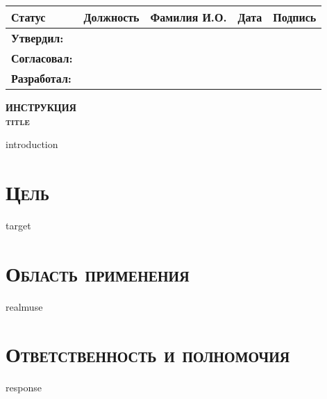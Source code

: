 {{{{{{{{\vspace{2mm}
\begin{tabu} to \textwidth { |X|X|X|X|X|   }
\hline
\textbf{Статус} & \textbf{Должность} & \textbf{Фамилия И.О.}& \textbf{Дата} & \textbf{Подпись} \\  [1ex] \hline
\textbf{Утвердил:}    & \approverPost{}  & \varApprover{}   & \varDateapprove{}   &  \\  [2ex] \hline
\textbf{Согласовал:}   & \visantPost{}    & \varVisant{}    & \varDatevise{}      &  \\  [2ex] \hline
\textbf{Разработал:}   & \initiatorPost{} & \varInitiator{} & \varDatecreation{}  &  \\  [2ex] \hline
\end{tabu}

\pagebreak

\pagestyle{firstpage}

\vspace{1cm}

\tableofcontents

\vfill

\pagebreak

\pagestyle{maintext}

\begin{center}
\Large \textbf{\textsc{ИНСТРУКЦИЯ}} \\
\vspace{1mm}
\Large \textbf{\textsc{ {{title}} }} \\
\end{center}

\begin{flushleft}

{{introduction}}

\section{\large \textbf{\textsc{Цель}}}
{{target}}

\section{\large \textbf{\textsc{Область применения}}}
{{realmuse}}

\section{\large \textbf{\textsc{Ответственность и полномочия}}}
{{response}}


\end{flushleft}}}}}}}}}
